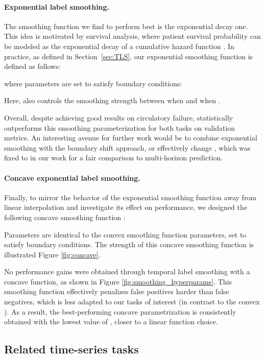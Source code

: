 \documentclass[nohyperref]{article}
\begin{document}
\paragraph{Exponential label smoothing.}
The smoothing function we find to perform best is the exponential decay one. This idea is motivated by survival analysis, where patient survival probability can be modeled as the exponential decay of a cumulative hazard function \cite{cox1972, collett2015modelling}. In practice, as defined in Section~\ref{sec:TLS}, our exponential smoothing function  is defined as follows:


where parameters  are set to satisfy boundary conditions:


Here,  also controls the smoothing strength between  when  and  when .

{Overall, despite  achieving good results on circulatory failure,  statistically outperforms this smoothing parameterization for both tasks on validation metrics. An interesting avenue for further work would be to combine exponential smoothing with the boundary shift approach, or effectively change , which was fixed to  in our work for a fair comparison to multi-horizon prediction.}




\paragraph{Concave exponential label smoothing.}

Finally, to mirror the behavior of the exponential smoothing function away from linear interpolation and investigate its effect on performance, we designed the following concave smoothing function :

Parameters  are identical to the convex smoothing function parameters, set to satisfy boundary conditions. The strength of this concave smoothing function is illustrated Figure \ref{fig:concave}.

No performance gains were obtained through temporal label smoothing with a concave function, as shown in Figure \ref{fig:smoothing_hyperparams}. This smoothing function effectively penalizes false positives harder than false negatives, which is less adapted to our tasks of interest (in contrast to the convex ). As a result, the best-performing concave parametrization is consistently obtained with the lowest value of , closer to a linear function choice.



\subsection{Related time-series tasks} \label{appendix:related_tasks}
\end{document}
